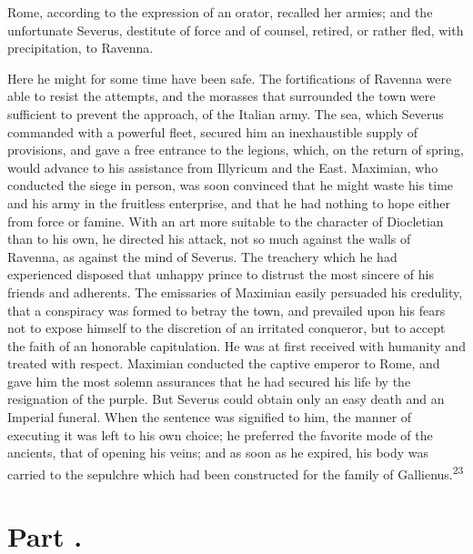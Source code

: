 Rome, according to the expression of an orator, recalled her
armies; and the unfortunate Severus, destitute of force and of
counsel, retired, or rather fled, with precipitation, to Ravenna.

Here he might for some time have been safe. The fortifications of
Ravenna were able to resist the attempts, and the morasses that
surrounded the town were sufficient to prevent the approach, of
the Italian army. The sea, which Severus commanded with a
powerful fleet, secured him an inexhaustible supply of
provisions, and gave a free entrance to the legions, which, on
the return of spring, would advance to his assistance from
Illyricum and the East. Maximian, who conducted the siege in
person, was soon convinced that he might waste his time and his
army in the fruitless enterprise, and that he had nothing to hope
either from force or famine. With an art more suitable to the
character of Diocletian than to his own, he directed his attack,
not so much against the walls of Ravenna, as against the mind of
Severus. The treachery which he had experienced disposed that
unhappy prince to distrust the most sincere of his friends and
adherents. The emissaries of Maximian easily persuaded his
credulity, that a conspiracy was formed to betray the town, and
prevailed upon his fears not to expose himself to the discretion
of an irritated conqueror, but to accept the faith of an
honorable capitulation. He was at first received with humanity
and treated with respect. Maximian conducted the captive emperor
to Rome, and gave him the most solemn assurances that he had
secured his life by the resignation of the purple. But Severus
could obtain only an easy death and an Imperial funeral. When the
sentence was signified to him, the manner of executing it was
left to his own choice; he preferred the favorite mode of the
ancients, that of opening his veins; and as soon as he expired,
his body was carried to the sepulchre which had been constructed
for the family of Gallienus.\textsuperscript{23}


\section{Part \thesection.}

